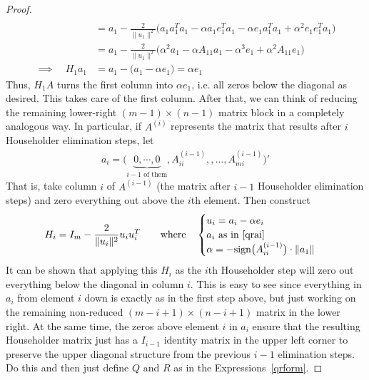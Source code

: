 \documentclass[12pt]{article}
\numberwithin{equation}{section} %
\theoremstyle{plain}
\theoremstyle{definition}
\theoremstyle{remark}
\begin{document}
\begin{proof}
\begin{align*}
  \\
  &= a_1
    - \frac{2}{\lVert u_1\rVert^2}
    \big(
      a_1a_1^Ta_1 - \alpha a_1e_1^Ta_1 - \alpha e_1a_1^Ta_1
      + \alpha^2e_1e_1^Ta_1
    \big)
  \\
  &= a_1
    - \frac{2}{\lVert u_1\rVert^2}
    \big(
      \alpha^2a_1
      - \alpha A_{11}a_1
      -\alpha^3 e_1
      + \alpha^2A_{11}e_1
    \big)
  \\
  \implies\quad H_1a_1
  &= a_1
    -
    \big(
      a_1
      - \alpha e_1
    \big)
  =\alpha e_1
\end{align*}
Thus, $H_1A$ turns the first column into $\alpha e_1$, i.e. all zeros
below the diagonal as desired.
This takes care of the first column. After that, we can think of
reducing the remaining lower-right $(m-1)\times (n-1)$ matrix block in a
completely analogous way. In particular, if $A^{(i)}$ represents the
matrix that results after $i$ Householder elimination steps, let
\begin{align}
  a_i =
  \big(
  \underbrace{0,\cdots, 0}_{\text{$i-1$ of them}},
  A_{ii}^{(i-1)}, ,\ldots,A_{mi}^{(i-1)}
  \big)'
  \label{qrai}
\end{align}
That is, take column $i$ of $A^{(i-1)}$ (the matrix after $i-1$
Householder elimination steps) and zero everything out above the $i$th
element. Then construct
\begin{align*}
  H_i = I_m - \frac{2}{\lVert u_i\lVert^2}u_iu_i^T
  \qquad \text{where}\quad
  \begin{cases}
    u_i = a_i -\alpha e_i \\
    \text{$a_i$ as in \ref{qrai}} \\
    \alpha = -\text{sign}\big(A_{ii}^{(i-1)}\big)\cdot \lVert a_1\rVert
  \end{cases}
\end{align*}
It can be shown that applying this $H_i$ as the $i$th Householder step
will zero out everything below the diagonal in column $i$. This is easy
to see since everything in $a_i$ from element $i$ down is exactly as in
the first step above, but just working on the remaining non-reduced
$(m-i+1)\times (n-i+1)$ matrix in the lower right. At the same time, the
zeros above element $i$ in $a_i$ ensure that the resulting Householder
matrix just has a $I_{i-1}$ identity matrix in the upper left corner to
preserve the upper diagonal structure from the previous $i-1$
elimination steps. Do this and then just define $Q$ and $R$ as in the
Expressions~\ref{qrform}.
\end{proof}
\end{document}
